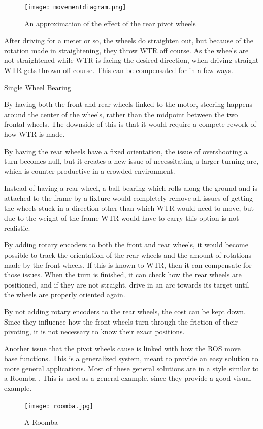 \begin{figure}[H]

\texttt{[image: movementdiagram.png]}
\caption{An approximation of the effect of the rear pivot wheels}
\label{fig::mvmnt}
\end{figure}
After driving for a meter or so, the wheels do straighten out, but because of the rotation made in straightening, they throw WTR off course.
As the wheels are not straightened while WTR is facing the desired direction, when driving straight WTR gets thrown off course.
This can be compensated for in a few ways.

\begin{labeling}{Single Wheel Bearing}
\item [Tank Controls] By having both the front and rear wheels linked to the motor, steering happens around the center of the wheels, rather than the midpoint between the two frontal wheels. The downside of this is that it would require a compete rework of how WTR is made.
\item [Fixed Rear Wheels] By having the rear wheels have a fixed orientation, the issue of overshooting a turn becomes null, but it creates a new issue of necessitating a larger turning arc, which is counter-productive in a crowded environment.
\item [Single Wheel Bearing] Instead of having a rear wheel, a ball bearing which rolls along the ground and is attached to the frame by a fixture would completely remove all issues of getting the wheels stuck in a direction other than which WTR would need to move, but due to the weight of the frame WTR would have to carry this option is not realistic.
\item [Rotary Encoders] By adding rotary encoders to both the front and rear wheels, it would become possible to track the orientation of the rear wheels and the amount of rotations made by the front wheels. If this is known to WTR, then it can compensate for those issues. When the turn is finished, it can check how the rear wheels are positioned, and if they are not straight, drive in an arc towards its target until the wheels are properly oriented again. 
\item [Front wheel encoders] By not adding rotary encoders to the rear wheels, the cost can be kept down. Since they influence how the front wheels turn through the friction of their pivoting, it is not necessary to know their exact positions.
\end{labeling}

Another issue that the pivot wheels cause is linked with how the ROS move\_ base functions.
This is a generalized system, meant to provide an easy solution to more general applications.
Most of these general solutions are in a style similar to a Roomba \cite{roomba}.
This is used as a general example, since they provide a good visual example.
\begin{figure}[H]
\centering
\texttt{[image: roomba.jpg]}\
\caption{A Roomba}
\label{fig::Roomba}
\end{figure}

